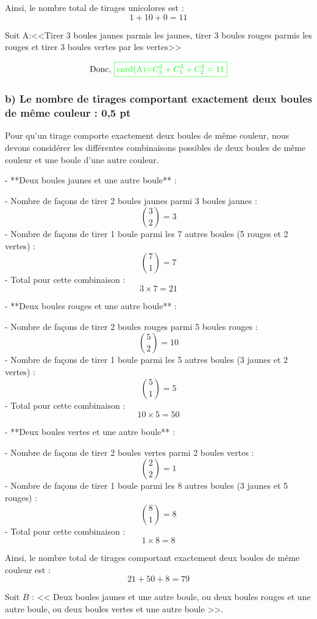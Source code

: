 \documentclass[12pt]{article}
\begin{document}
Ainsi, le nombre total de tirages unicolores est :
\[
1 + 10 + 0 = 11
\]
\textbf{\color{green}{Autrement dit :}}

Soit A:<<Tirer 3 boules jaunes parmis les jaunes, tirer 3 boules rouges parmis les rouges et tirer 3 boules vertes par les vertes>>

\[\text{Donc, }\color{green}{\boxed{\text{card(A)=}  C_{3}^{3} + C_{5}^{3} + C_{2}^{3}=11}}\]
\subsubsection*{b) Le nombre de tirages comportant exactement deux boules de même couleur : \textbf{0,5 pt}}

Pour qu'un tirage comporte exactement deux boules de même couleur, nous devons considérer les différentes combinaisons possibles de deux boules de même couleur et une boule d'une autre couleur.

- **Deux boules jaunes et une autre boule** :

  - Nombre de façons de tirer 2 boules jaunes parmi 3 boules jaunes :
    \[
    \binom{3}{2} = 3
    \]
  - Nombre de façons de tirer 1 boule parmi les 7 autres boules (5 rouges et 2 vertes) :
    \[
    \binom{7}{1} = 7
    \]
  - Total pour cette combinaison :
    \[
    3 \times 7 = 21
    \]

- **Deux boules rouges et une autre boule** :

  - Nombre de façons de tirer 2 boules rouges parmi 5 boules rouges :
    \[
    \binom{5}{2} = 10
    \]
  - Nombre de façons de tirer 1 boule parmi les 5 autres boules (3 jaunes et 2 vertes) :
    \[
    \binom{5}{1} = 5
    \]
  - Total pour cette combinaison :
    \[
    10 \times 5 = 50
    \]

- **Deux boules vertes et une autre boule** :

  - Nombre de façons de tirer 2 boules vertes parmi 2 boules vertes :
    \[
    \binom{2}{2} = 1
    \]
  - Nombre de façons de tirer 1 boule parmi les 8 autres boules (3 jaunes et 5 rouges) :
    \[
    \binom{8}{1} = 8
    \]
  - Total pour cette combinaison :
    \[
    1 \times 8 = 8
    \]

Ainsi, le nombre total de tirages comportant exactement deux boules de même couleur est :
\[
21 + 50 + 8 = 79
\]
\textbf{\color{green}{Autrement dit :}}

Soit $B$ : << Deux boules jaunes et une autre boule, ou deux boules rouges et une autre boule, ou deux boules vertes et une autre boule >>.
\end{document}

